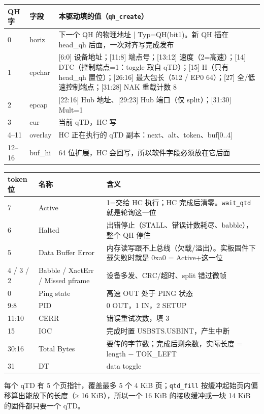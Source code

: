 \documentclass[UTF8,zihao=-4,fontset=none]{ctexart}
\newcommand{\fn}[1]{\texttt{#1}}
\begin{document}
\begin{longtable}{p{14mm}p{30mm}p{104mm}}
\toprule
QH 字 & 字段 & 本驱动填的值（\fn{qh\_create}） \\ \midrule \endhead
0 & horiz & 下一个 QH 的物理地址 | Typ=QH(bit1)。新 QH 插在 head\_qh 后面，一次对齐写完成发布 \\
1 & epchar & [6:0] 设备地址；[11:8] 端点号；[13:12] 速度（2=高速）；[14] DTC（控制端点=1：toggle 取自 qTD）；[15] H（只有 head\_qh 置位）；[26:16] 最大包长（512 / EP0 64）；[27] 全/低速控制端点；[31:28] NAK 重载计数 8 \\
2 & epcap & [22:16] Hub 地址、[29:23] Hub 端口（仅 split）；[31:30] Mult=1 \\
3 & cur & 当前 qTD，HC 写 \\
4--11 & overlay & HC 正在执行的 qTD 副本：next、alt、token、buf[0..4] \\
12--16 & buf\_hi & 64 位扩展，HC 会回写，所以软件字段必须放在它后面 \\
\bottomrule
\end{longtable}

\begin{longtable}{p{14mm}p{30mm}p{104mm}}
\toprule
token 位 & 名称 & 含义 \\ \midrule \endhead
7 & Active & 1=交给 HC 执行；HC 完成后清零。\fn{wait\_qtd} 就是轮询这一位 \\
6 & Halted & 出错停止（STALL、错误计数耗尽、babble），整个 QH 停住 \\
5 & Data Buffer Error & 内存读写跟不上总线（欠载/溢出）。实板固件下载失败时就是 0xa0 = Active+这一位 \\
4 / 3 / 2 & Babble / XactErr / Missed µframe & 设备多发、CRC/超时、split 错过微帧 \\
0 & Ping state & 高速 OUT 处于 PING 状态 \\
9:8 & PID & 0 OUT，1 IN，2 SETUP \\
11:10 & CERR & 错误重试次数，填 3 \\
15 & IOC & 完成时置 USBSTS.USBINT，产生中断 \\
30:16 & Total Bytes & 要传的字节数；完成后剩余数，实际长度 = length − TOK\_LEFT \\
31 & DT & data toggle \\
\bottomrule
\end{longtable}

每个 qTD 有 5 个页指针，覆盖最多 5 个 4 KiB 页；\fn{qtd\_fill} 按缓冲起始页内偏移算出能放下的长度（≥ 16 KiB），所以一个 16 KiB 的接收缓冲或一块 14 KiB 的固件都只要一个 qTD。
\end{document}
